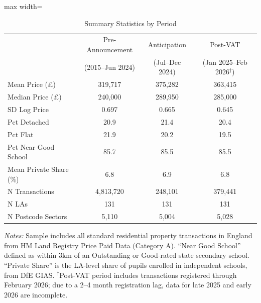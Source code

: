 \begin{table}[htbp]
\centering
\caption{Summary Statistics by Period}
\label{tab:sumstats}
\begin{adjustbox}{max width=\textwidth}
\begin{tabular}{lccc}
\hline\hline
 & Pre-Announcement & Anticipation & Post-VAT \\
 & (2015--Jun 2024) & (Jul--Dec 2024) & (Jan 2025--Feb 2026$^\dagger$) \\
\hline
Mean Price (£)  &  319,717 & 375,282 & 363,415  \\
Median Price (£)  &  240,000 & 289,950 & 285,000  \\
SD Log Price  &  0.697 & 0.665 & 0.645  \\
Pct Detached  &  20.9 & 21.4 & 20.4  \\
Pct Flat  &  21.9 & 20.2 & 19.5  \\
Pct Near Good School  &  85.7 & 85.5 & 85.5  \\
Mean Private Share (\%)  &  6.8 & 6.9 & 6.8  \\
\hline
N Transactions  &  4,813,720 & 248,101 & 379,441  \\
N LAs  &  131 & 131 & 131  \\
N Postcode Sectors  &  5,110 & 5,004 & 5,028  \\
\hline\hline
\end{tabular}
\end{adjustbox}
\begin{tablenotes}\small
\item \textit{Notes:} Sample includes all standard residential property transactions in England from HM Land Registry Price Paid Data (Category A). ``Near Good School'' defined as within 3km of an Outstanding or Good-rated state secondary school. ``Private Share'' is the LA-level share of pupils enrolled in independent schools, from DfE GIAS. $^\dagger$Post-VAT period includes transactions registered through February 2026; due to a 2--4 month registration lag, data for late 2025 and early 2026 are incomplete.
\end{tablenotes}
\end{table}
